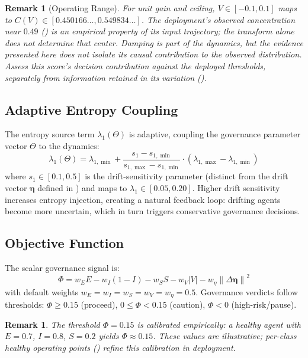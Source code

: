 \documentclass[11pt,twocolumn]{article}
\newtheorem{remark}[theorem]{Remark}
\newcommand{\norm}[1]{\left\lVert #1 \right\rVert}
\newcommand{\abs}[1]{\left| #1 \right|}
\newcommand{\deta}{\ensuremath{\Delta\bm{\eta}}}
\begin{document}
\begin{remark}[Operating Range]
\label{rem:operating-range}
For unit gain and ceiling, $V \in [-0.1, 0.1]$ maps to
$C(V) \in [0.450166\ldots, 0.549834\ldots]$. The deployment's
observed concentration near $0.49$ () is an
empirical property of its input trajectory; the transform alone
does not determine that center. Damping is part of the dynamics,
but the evidence presented here does not isolate its causal
contribution to the observed distribution. Assess this score's
decision contribution against the deployed thresholds, separately
from information retained in its variation
().
\end{remark}

\subsection{Adaptive Entropy Coupling}

The entropy source term $\lambda_1(\Theta)$ is adaptive, coupling the
governance parameter vector $\Theta$ to the dynamics:
\begin{equation}
  \lambda_1(\Theta) = \lambda_{1,\min} +
  \frac{s_1 - s_{1,\min}}{s_{1,\max} - s_{1,\min}}
  \cdot (\lambda_{1,\max} - \lambda_{1,\min})
  \label{eq:lambda1}
\end{equation}
where $s_1 \in [0.1, 0.5]$ is the drift-sensitivity parameter
(distinct from the drift vector $\bm\eta$ defined in
) and maps to $\lambda_1 \in [0.05, 0.20]$.
Higher drift sensitivity increases entropy injection, creating
a natural feedback loop: drifting agents become more uncertain, which
in turn triggers conservative governance decisions.

\subsection{Objective Function}

The scalar governance signal is:
\begin{equation}
  \Phi = w_E E - w_I(1-I) - w_S S - w_V\abs{V} - w_\eta\norm{\deta}^2
  \label{eq:phi}
\end{equation}
with default weights $w_E = w_I = w_S = w_V = w_\eta = 0.5$.
Governance verdicts follow thresholds: $\Phi \geq 0.15$ (proceed),
$0 \leq \Phi < 0.15$ (caution), $\Phi < 0$ (high-risk/pause).

\begin{remark}
The threshold $\Phi = 0.15$ is calibrated empirically: a healthy
agent with $E = 0.7$, $I = 0.8$, $S = 0.2$ yields $\Phi \approx
0.15$. These values are illustrative; per-class healthy operating
points () refine this calibration in
deployment.
\end{remark}
\end{document}
